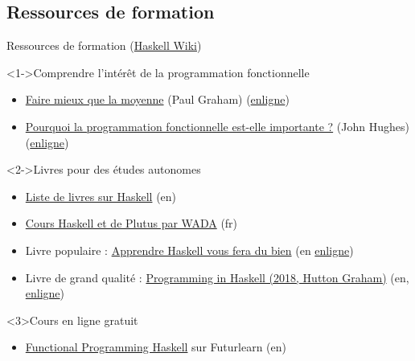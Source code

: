 \documentclass[presentation]{beamer}
\begin{document}
\subsection{Ressources de formation}
\label{sec:org91b6df9}
\begin{frame}[label={sec:orgb81d234}]{Ressources de formation (\href{https://wiki.haskell.org/Haskell}{Haskell Wiki})}
\begin{block}<1->{Comprendre l'intérêt de la programmation fonctionnelle}
\begin{itemize}
\item \href{Ressources/beating\_average.pdf}{Faire mieux que la moyenne} (Paul Graham) (\href{https://franz.com/about/conferences/fds2001/presentations/pgtalk-rev2.pdf}{enligne})
\item \href{Ressources/why\_functionnal\_programming\_matter.pdf}{Pourquoi la programmation fonctionnelle est-elle importante ?} (John Hughes) (\href{https://www.cse.chalmers.se/\~rjmh/Papers/whyfp.pdf}{enligne})
\end{itemize}
\end{block}

\begin{block}<2->{Livres pour des études autonomes}
\begin{itemize}
\item \href{https://wiki.haskell.org/Books}{Liste de livres sur Haskell} (en)
\item \href{https://github.com/WADAlliance/Haskell\_Plutus\_Course}{Cours Haskell et de Plutus par WADA} (fr)
\item Livre populaire : \href{Ressources/learn\_you\_haskell\_for\_great\_good.pdf}{Apprendre Haskell vous fera du bien} (en \href{https://learnyouahaskell.github.io/chapters.html}{enligne})
\item Livre de grand qualité : \href{Ressources/Hutton\_G\_Programming\_in\_Haskell-Cambridge\_UP\_2018.pdf}{Programming in Haskell (2018, Hutton Graham)} (en, \href{https://www.cambridge.org/us/academic/subjects/computer-science/programming-languages-and-applied-logic/programming-haskell-2nd-edition}{enligne})
\end{itemize}
\end{block}
\begin{block}<3>{Cours en ligne gratuit}
\begin{itemize}
\item \href{https://www.futurelearn.com/courses/functional-programming-haskell}{Functional Programming Haskell} sur Futurlearn (en)
\end{itemize}
\end{block}
\end{frame}
\end{document}
